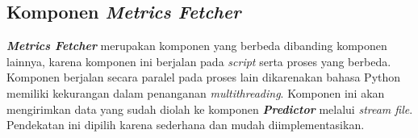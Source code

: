 \subsection{Komponen \textit{Metrics Fetcher}}
\textbf{\textit{Metrics Fetcher}} merupakan komponen yang berbeda dibanding komponen lainnya, karena komponen ini berjalan pada \textit{script} serta proses yang berbeda. Komponen berjalan secara paralel pada proses lain dikarenakan bahasa Python memiliki kekurangan dalam penanganan \textit{multithreading}. Komponen ini akan mengirimkan data yang sudah diolah ke komponen \textbf{\textit{Predictor}} melalui \textit{stream file}. Pendekatan ini dipilih karena sederhana dan mudah diimplementasikan. 
